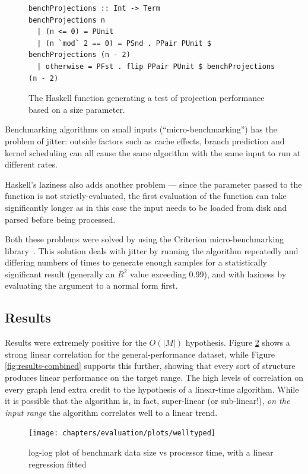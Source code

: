 \begin{figure}
\begin{verbatim}
benchProjections :: Int -> Term
benchProjections n
  | (n <= 0) = PUnit
  | (n `mod` 2 == 0) = PSnd . PPair PUnit $ benchProjections (n - 2)
  | otherwise = PFst . flip PPair PUnit $ benchProjections (n - 2)
\end{verbatim}
\caption{The Haskell function generating a test of projection performance based on a size parameter.}
\label{figure:projection-sample}
\end{figure}

Benchmarking algorithms on small inputs (``micro-benchmarking'') has the problem of jitter: outside factors such as cache effects, branch prediction and kernel scheduling can all cause the same algorithm with the same input to run at different rates.

Haskell's laziness also adds another problem --- since the parameter passed to the function is not strictly-evaluated, the first evaluation of the function can take significantly longer as in this case the input needs to be loaded from disk and parsed before being processed.

Both these problems were solved by using the Criterion micro-benchmarking library~\cite{criterion}.
This solution deals with jitter by running the algorithm repeatedly and differing numbers of times to generate enough samples for a statistically significant result (generally an \(R^2\) value exceeding 0.99), and with laziness by evaluating the argument to a normal form first.

\subsection{Results}
Results were extremely positive for the \(O(|M|)\) hypothesis.
Figure \ref{fig:results-welltyped} shows a strong linear correlation for the general-performance dataset, while Figure \ref{fig:results-combined} supports this further, showing that every sort of structure produces linear performance on the target range.
The high levels of correlation on every graph lend extra credit to the hypothesis of a linear-time algorithm.
While it is possible that the algorithm is, in fact, super-linear (or sub-linear!), \emph{on the input range} the algorithm correlates well to a linear trend.

\begin{figure}
\centering
\texttt{[image: chapters/evaluation/plots/welltyped]}
\caption{log-log plot of benchmark data size vs processor time, with a linear regression fitted}
\label{fig:results-welltyped}
\end{figure}

